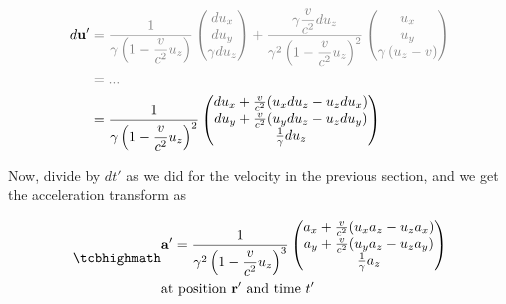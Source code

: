 \begin{equation}
	\begin{aligned}
		d\mathbf{u}{'} &\color{gray} = \dfrac{1}{{\gamma}\left(1-\dfrac{v}{{c}^2} {{u}_{z}}\right) }
		\begin{pmatrix}
			d{{u}_{x}}          \\
			d{{u}_{y}}          \\
			{\gamma} d{{u}_{z}} \\
		\end{pmatrix}
		+ \dfrac{{\gamma} \dfrac{v}{{c}^2} d{{u}_{z}}}{{\gamma}^2\left(1-\dfrac{v}{{c}^2} {{u}_{z}}\right)^2 }
		\begin{pmatrix}
			{{u}_{x}}                              \\
			{{u}_{y}}                              \\
			{\gamma} \left( {{u}_{z}}- {v} \right) \\
		\end{pmatrix} \\
		               &\color{gray} = ...
		\\
		               & = \dfrac{1}{{\gamma}\left(1-\dfrac{v}{{c}^2} {{u}_{z}}\right)^2 }
		\begin{pmatrix}
			d{{u}_{x}} + \frac{v}{{c}^2}( {{u}_{x}} d{{u}_{z}}-{{u}_{z}} d{{u}_{x}}) \\
			d{{u}_{y}} + \frac{v}{{c}^2}( {{u}_{y}} d{{u}_{z}}-{{u}_{z}} d{{u}_{y}}) \\
			\frac{1}{{\gamma}} d{{u}_{z}}                                            \\
		\end{pmatrix}
	\end{aligned}
\end{equation}

Now, divide by ${dt{'}}$ as we did for the velocity in the previous section, and we get the acceleration transform as

\begin{equation}
	\mhl{
		\begin{aligned}
			&\mathbf{a}{'} = \dfrac{1}{{\gamma}^2\left(1-\dfrac{v}{{c}^2} {{u}_{z}}\right)^3 }
			\begin{pmatrix}
				{{a}_{x}} + \frac{v}{{c}^2}({{u}_{x}} {{a}_{z}}-{{u}_{z}} {{a}_{x}}) \\
				{{a}_{y}} + \frac{v}{{c}^2}({{u}_{y}} {{a}_{z}}-{{u}_{z}} {{a}_{y}}) \\
				\frac{1}{{\gamma}} {{a}_{z}}                                         \\
			\end{pmatrix}
			\\
			&\text{at position ${\mathbf{r}{'}}$ and time ${t{'}}$ }
		\end{aligned}
	}
	\label{eq: acceleration transform}
\end{equation}

